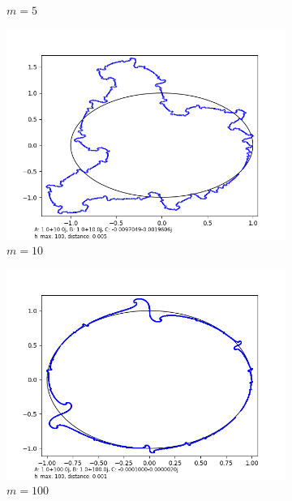 \documentclass[12pt,a4paper,reqno,parskip=full]{amsart}
\numberwithin{equation}{section}
\theoremstyle{plain}
\theoremstyle{definition}
\begin{document}
\begin{figure}
\begin{subfigure}[b]{0.3\textwidth}
         \caption{$m=5$}
         \label{fig:m5}
     \end{subfigure}
     \hfill 
     \begin{subfigure}[b]{0.3\textwidth}
         \centering
         \includegraphics[width=\textwidth]{images/m/a10,b10,h100,d.005.png}
         \caption{$m=10$}
         \label{fig:m10}
     \end{subfigure}
     \begin{subfigure}[b]{0.3\textwidth}
         \centering
         \includegraphics[width=\textwidth]{images/m/a100,b100,h100,d.0010.png}
         \caption{$m=100$}
         \label{fig:m100}
     \end{subfigure}
     \hfill
     \begin{subfigure}[b]{0.3\textwidth}

\end{subfigure}
\end{figure}
\end{document}
